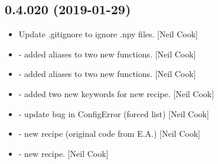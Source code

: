 \documentclass[a4paper,10pt,english]{report}
\begin{document}
\subsection{0.4.020 (2019-01-29)}
\label{\detokenize{misc/changelog:id203}}\begin{itemize}
\item {} 
Update .gitignore to ignore .npy files. {[}Neil Cook{]}

\item {} 
 - added aliases to two new  functions. {[}Neil
Cook{]}

\item {} 
 - added aliases to two new 
functions. {[}Neil Cook{]}

\item {} 
 - added two new keywords for new  recipe.
{[}Neil Cook{]}

\item {} 
 - update bug in ConfigError (forced list) {[}Neil Cook{]}

\item {} 
 - new  recipe (original code from E.A.) {[}Neil
Cook{]}

\item {} 
 - new  recipe. {[}Neil Cook{]}

\end{itemize}
\end{document}
